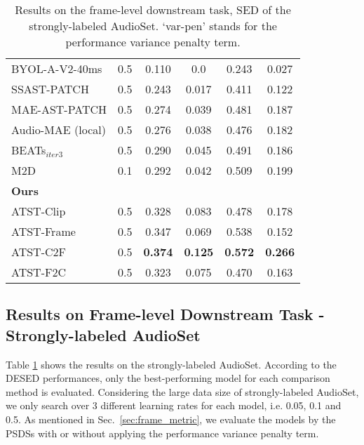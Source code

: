 \begin{table}[tb]
{\begin{tabular}{l|c|cc|cc}
        BYOL-A-V2-40ms \cite{niizumi_byol_2023}      & 0.5 & 0.110 & 0.0 & 0.243 & 0.027 \\
        SSAST-PATCH     \cite{gong_ssast_2022}       & 0.5 & 0.243 & 0.017 & 0.411 & 0.122 \\
        MAE-AST-PATCH   \cite{baade_mae-ast_2022}    & 0.5 & 0.274 & 0.039 & 0.481 & 0.187 \\
        Audio-MAE (local) \cite{huang_masked_2023}   & 0.5 & 0.276 & 0.038 & 0.476 & 0.182 \\
        BEATs$_{iter3}$ \cite{chen_beats_2022}       & 0.5 & 0.290 & 0.045 & 0.491 & 0.186 \\
        M2D \cite{niizumi_masked_2023}               & 0.1 & 0.292 & 0.042 & 0.509 & 0.199 \\
        \midrule
        \multicolumn{6}{l}{\textbf{Ours}} \\
        ATST-Clip  & 0.5 & 0.328 & 0.083 & 0.478 & 0.178 \\
        ATST-Frame & 0.5 & 0.347 & 0.069 & 0.538 & 0.152 \\
        ATST-C2F   & 0.5 & \textbf{0.374} & \textbf{0.125} & \textbf{0.572} & \textbf{0.266} \\
        \textcolor{mygray}{ATST-F2C} & \textcolor{mygray}{0.5} & \textcolor{mygray}{0.323} & \textcolor{mygray}{0.075} & \textcolor{mygray}{0.470} & \textcolor{mygray}{0.163} \\
        \bottomrule
        \end{tabular}
    }
  \caption{Results on the frame-level downstream task, SED of the strongly-labeled AudioSet. `var-pen' stands for the performance variance penalty term.   } 
  \label{tab:audioset_strong}
\end{table}

\subsection{Results on Frame-level Downstream Task - Strongly-labeled AudioSet}
\label{sec:audioset_strong}

Table \ref{tab:audioset_strong} shows the results on the strongly-labeled AudioSet. According to the DESED performances, only the best-performing model for each comparison method is evaluated. 
Considering the large data size of strongly-labeled AudioSet, we only search over 3 different learning rates for each model, i.e. 0.05, 0.1 and 0.5. 
As mentioned in Sec.~\ref{sec:frame_metric}, we evaluate the models by the PSDSs with or without applying the performance variance penalty term. 

